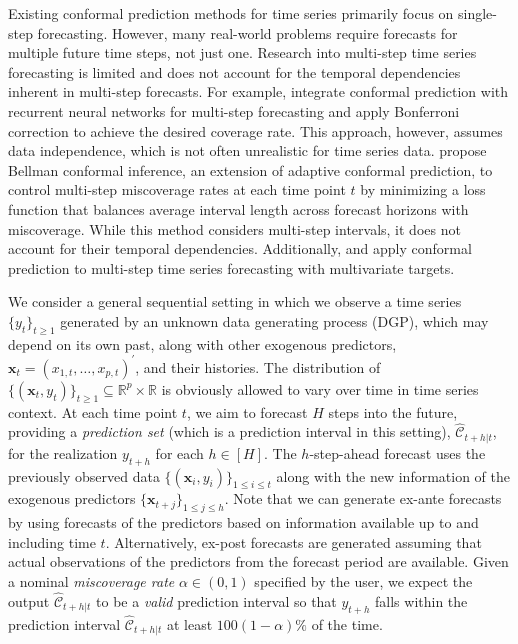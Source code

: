 \documentclass[
  11pt,
  a4paper,
]{article}
\theoremstyle{plain}
\theoremstyle{remark}
\begin{document}
Existing conformal prediction methods for time series primarily focus on
single-step forecasting. However, many real-world problems require
forecasts for multiple future time steps, not just one. Research into
multi-step time series forecasting is limited and does not account for
the temporal dependencies inherent in multi-step forecasts. For example,
\textcite{stankeviciute2021} integrate conformal prediction with
recurrent neural networks for multi-step forecasting and apply
Bonferroni correction to achieve the desired coverage rate. This
approach, however, assumes data independence, which is not often
unrealistic for time series data. \textcite{yang2024ts} propose Bellman
conformal inference, an extension of adaptive conformal prediction, to
control multi-step miscoverage rates at each time point \(t\) by
minimizing a loss function that balances average interval length across
forecast horizons with miscoverage. While this method considers
multi-step intervals, it does not account for their temporal
dependencies. Additionally, \textcite{schlembach2022} and
\textcite{sun2022} apply conformal prediction to multi-step time series
forecasting with multivariate targets.

We consider a general sequential setting in which we observe a time
series \(\{y_t\}_{t \geq 1}\) generated by an unknown data generating
process (DGP), which may depend on its own past, along with other
exogenous predictors, \(\bm{x}_t=(x_{1,t},\ldots,x_{p,t})^{\prime}\),
and their histories. The distribution of
\(\{(\bm{x}_t, y_t)\}_{t \geq 1} \subseteq \mathbb{R}^p \times \mathbb{R}\)
is obviously allowed to vary over time in time series context. At each
time point \(t\), we aim to forecast \(H\) steps into the future,
providing a \emph{prediction set} (which is a prediction interval in
this setting), \(\hat{\mathcal{C}}_{t+h|t}\), for the realization
\(y_{t+h}\) for each \(h\in[H]\). The \(h\)-step-ahead forecast uses the
previously observed data \(\{(\bm{x}_i, y_i)\}_{1 \leq i \leq t}\) along
with the new information of the exogenous predictors
\(\{\bm{x}_{t+j}\}_{1\leq j\leq h}\). Note that we can generate ex-ante
forecasts by using forecasts of the predictors based on information
available up to and including time \(t\). Alternatively, ex-post
forecasts are generated assuming that actual observations of the
predictors from the forecast period are available. Given a nominal
\emph{miscoverage rate} \(\alpha \in (0,1)\) specified by the user, we
expect the output \(\hat{\mathcal{C}}_{t+h|t}\) to be a \emph{valid}
prediction interval so that \(y_{t+h}\) falls within the prediction
interval \(\hat{\mathcal{C}}_{t+h|t}\) at least \(100(1-\alpha)\%\) of
the time.
\end{document}
